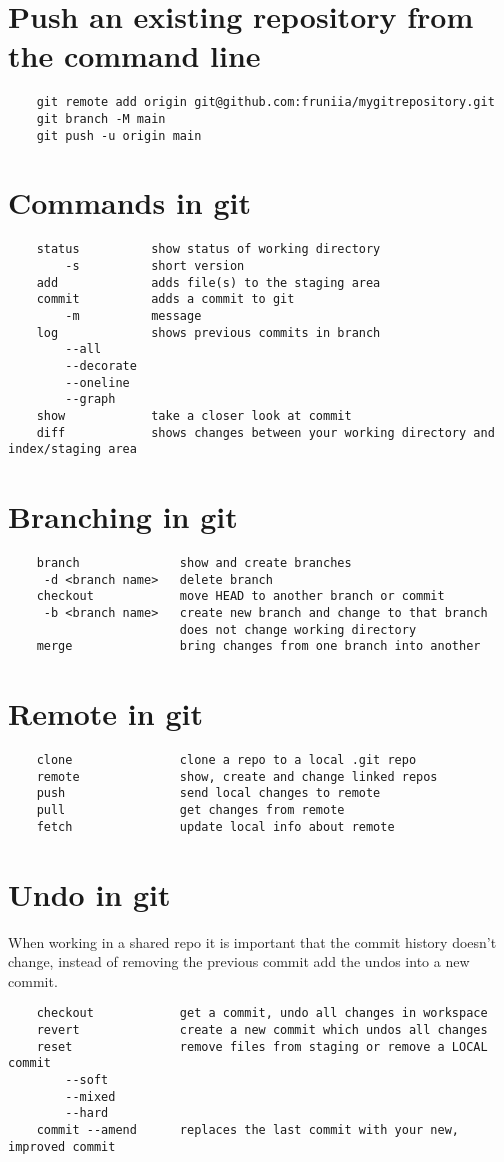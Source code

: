 \documentclass[10pt, a4paper]{article}
\begin{document}
\section*{Push an existing repository from the command line}
\begin{verbatim}
    git remote add origin git@github.com:fruniia/mygitrepository.git
    git branch -M main
    git push -u origin main
\end{verbatim}
\newpage
\section*{Commands in git}
\begin{verbatim}
    status          show status of working directory
        -s          short version
    add             adds file(s) to the staging area
    commit          adds a commit to git
        -m          message
    log             shows previous commits in branch
        --all
        --decorate
        --oneline
        --graph
    show            take a closer look at commit
    diff            shows changes between your working directory and index/staging area
\end{verbatim}
\section*{Branching in git}
\begin{verbatim}
    branch              show and create branches
     -d <branch name>   delete branch          
    checkout            move HEAD to another branch or commit
     -b <branch name>   create new branch and change to that branch
                        does not change working directory
    merge               bring changes from one branch into another
\end{verbatim}
\section*{Remote in git}
\begin{verbatim}
    clone               clone a repo to a local .git repo     
    remote              show, create and change linked repos
    push                send local changes to remote
    pull                get changes from remote
    fetch               update local info about remote
\end{verbatim}
\section*{Undo in git}
When working in a shared repo it is important that the commit history doesn't change, instead
of removing the previous commit add the undos into a new commit.
\begin{verbatim}
    checkout            get a commit, undo all changes in workspace
    revert              create a new commit which undos all changes
    reset               remove files from staging or remove a LOCAL commit
        --soft
        --mixed
        --hard
    commit --amend      replaces the last commit with your new, improved commit
\end{verbatim}
\end{document}
